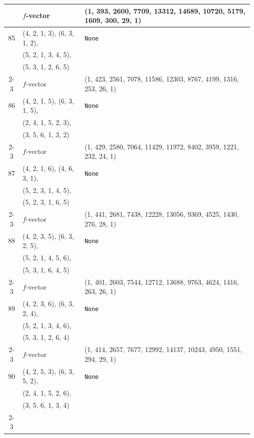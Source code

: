\documentclass[10pt]{amsart}
\numberwithin{equation}{section}
\theoremstyle{plain}
\theoremstyle{definition}
\theoremstyle{remark}
\begin{document}
{\begin{longtable}{c|l|l}
		& $f$-vector & {(1, 393, 2600, 7709, 13312, 14689, 10720, 5179, 1609, 300, 29, 1)} \\
		\midrule
		
		85 & (4, 2, 1, 3), (6, 3, 1, 2), & \texttt{None} \\
		& (5, 2, 1, 3, 4, 5), &  \\
		& (5, 3, 1, 2, 6, 5) &  \\ \cline{2-3}
		
		& $f$-vector & {(1, 423, 2561, 7078, 11586, 12303, 8767, 4199, 1316, 253, 26, 1)} \\
		\midrule
		
		86 & (4, 2, 1, 5), (6, 3, 1, 5), & \texttt{None} \\
		& (2, 4, 1, 5, 2, 3), &  \\
		& (3, 5, 6, 1, 3, 2) &  \\ \cline{2-3}
		
		& $f$-vector & {(1, 429, 2580, 7064, 11429, 11972, 8402, 3959, 1221, 232, 24, 1)} \\
		\midrule
		
		87 & (4, 2, 1, 6), (4, 6, 3, 1), & \texttt{None} \\
		& (5, 2, 3, 1, 4, 5), &  \\
		& (5, 2, 3, 1, 6, 5) &  \\ \cline{2-3}
		
		& $f$-vector & {(1, 441, 2681, 7438, 12228, 13056, 9369, 4525, 1430, 276, 28, 1)} \\
		\midrule
		
		88 & (4, 2, 3, 5), (6, 3, 2, 5), & \texttt{None} \\
		& (5, 2, 1, 4, 5, 6), &  \\
		& (5, 3, 1, 6, 4, 5) &  \\ \cline{2-3}
		
		& $f$-vector & {(1, 401, 2603, 7544, 12712, 13688, 9763, 4624, 1416, 263, 26, 1)} \\
		\midrule
		
		89 & (4, 2, 3, 6), (6, 3, 2, 4), & \texttt{None} \\
		& (5, 2, 1, 3, 4, 6), &  \\
		& (5, 3, 1, 2, 6, 4) &  \\ \cline{2-3}
		
		& $f$-vector & {(1, 414, 2657, 7677, 12992, 14137, 10243, 4950, 1551, 294, 29, 1)} \\
		\midrule
		
		90 & (4, 2, 5, 3), (6, 3, 5, 2), & \texttt{None} \\
		& (2, 4, 1, 5, 2, 6), &  \\
		& (3, 5, 6, 1, 3, 4) &  \\ \cline{2-3}
		

\end{longtable}}
\end{document}
